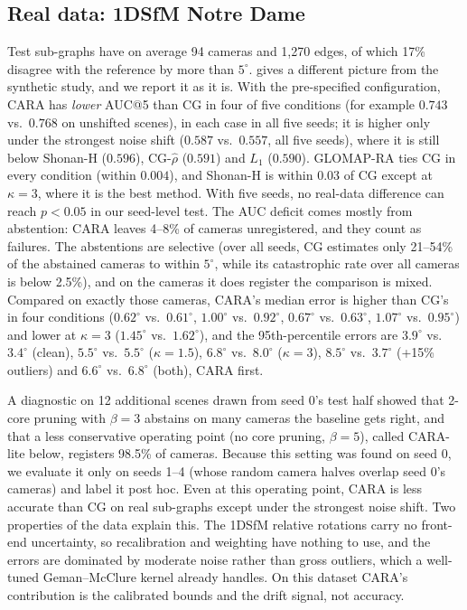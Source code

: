 

\subsection{Real data: 1DSfM Notre Dame}\label{sec:real}
Test sub-graphs have on average 94 cameras and 1,270 edges, of which 17\% disagree with the reference by more than $5^\circ$.  gives a different picture from the synthetic study, and we report it as it is. With the pre-specified configuration, CARA has \emph{lower} AUC@5 than CG in four of five conditions (for example $0.743$ vs.\ $0.768$ on unshifted scenes), in each case in all five seeds; it is higher only under the strongest noise shift ($0.587$ vs.\ $0.557$, all five seeds), where it is still below Shonan-H ($0.596$), CG-$\hat\rho$ ($0.591$) and $L_1$ ($0.590$). GLOMAP-RA ties CG in every condition (within $0.004$), and Shonan-H is within $0.03$ of CG except at $\kappa=3$, where it is the best method. With five seeds, no real-data difference can reach $p<0.05$ in our seed-level test. The AUC deficit comes mostly from abstention: CARA leaves 4--8\% of cameras unregistered, and they count as failures. The abstentions are selective (over all seeds, CG estimates only 21--54\% of the abstained cameras to within $5^\circ$, while its catastrophic rate over all cameras is below 2.5\%), and on the cameras it does register the comparison is mixed. Compared on exactly those cameras, CARA's median error is higher than CG's in four conditions ($0.62^\circ$ vs.\ $0.61^\circ$, $1.00^\circ$ vs.\ $0.92^\circ$, $0.67^\circ$ vs.\ $0.63^\circ$, $1.07^\circ$ vs.\ $0.95^\circ$) and lower at $\kappa=3$ ($1.45^\circ$ vs.\ $1.62^\circ$), and the 95th-percentile errors are $3.9^\circ$ vs.\ $3.4^\circ$ (clean), $5.5^\circ$ vs.\ $5.5^\circ$ ($\kappa=1.5$), $6.8^\circ$ vs.\ $8.0^\circ$ ($\kappa=3$), $8.5^\circ$ vs.\ $3.7^\circ$ (+15\% outliers) and $6.6^\circ$ vs.\ $6.8^\circ$ (both), CARA first.

A diagnostic on 12 additional scenes drawn from seed 0's test half showed that 2-core pruning with $\beta=3$ abstains on many cameras the baseline gets right, and that a less conservative operating point (no core pruning, $\beta=5$), called CARA-lite below, registers 98.5\% of cameras. Because this setting was found on seed 0, we evaluate it only on seeds 1--4 (whose random camera halves overlap seed 0's cameras) and label it post hoc.  Even at this operating point, CARA is less accurate than CG on real sub-graphs except under the strongest noise shift. Two properties of the data explain this. The 1DSfM relative rotations carry no front-end uncertainty, so recalibration and weighting have nothing to use, and the errors are dominated by moderate noise rather than gross outliers, which a well-tuned Geman--McClure kernel already handles. On this dataset CARA's contribution is the calibrated bounds and the drift signal, not accuracy.

